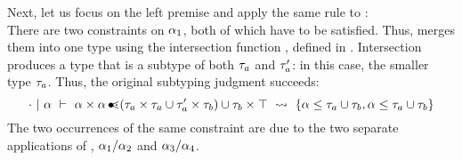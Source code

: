Next, let us focus on the left premise and apply the same rule to \va:\\
There are two constraints on $\alpha_1$, both of which have to be satisfied.
Thus,  merges them into one type using the intersection
function , defined in .
Intersection produces a type that is a subtype of both $\tau_a$ and $\tau'_a$:
in this case, the smaller type $\tau_a$.
Thus, the original subtyping judgment succeeds:
\[
    \cdot~\vert~\alpha\ \vdash\ \alpha \times \alpha \operatorname{\bullet\!\!\lessdot} (\tau_a \times \tau_a \cup \tau'_a \times \tau_b) \cup \tau_b \times \top\ \rightsquigarrow\  \{\alpha \leq \tau_a \cup \tau_b, \alpha \leq \tau_a \cup \tau_b\} 
\]
The two occurrences of the same constraint are due to the two separate
applications of , $\alpha_1/\alpha_2$ and $\alpha_3/\alpha_4$.

